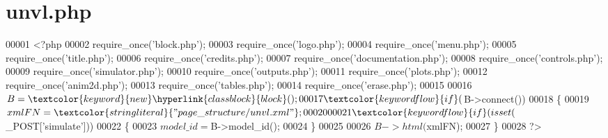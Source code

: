 \hypertarget{unvl_8php_source}{\section{unvl.\-php}
}

\begin{DoxyCode}
00001 <?php
00002 require\_once(\textcolor{stringliteral}{'block.php'});
00003 require\_once(\textcolor{stringliteral}{'logo.php'});
00004 require\_once(\textcolor{stringliteral}{'menu.php'});
00005 require\_once(\textcolor{stringliteral}{'title.php'});
00006 require\_once(\textcolor{stringliteral}{'credits.php'});
00007 require\_once(\textcolor{stringliteral}{'documentation.php'});
00008 require\_once(\textcolor{stringliteral}{'controls.php'});
00009 require\_once(\textcolor{stringliteral}{'simulator.php'});
00010 require\_once(\textcolor{stringliteral}{'outputs.php'});
00011 require\_once(\textcolor{stringliteral}{'plots.php'});
00012 require\_once(\textcolor{stringliteral}{'anim2d.php'});
00013 require\_once(\textcolor{stringliteral}{'tables.php'});
00014 require\_once(\textcolor{stringliteral}{'erase.php'});
00015 
00016 $B=\textcolor{keyword}{new} \hyperlink{classblock}{block}();
00017 \textcolor{keywordflow}{if}($B->connect())
00018 \{
00019   $xmlFN=\textcolor{stringliteral}{"page\_structure/unvl.xml"};
00020 
00021   \textcolor{keywordflow}{if}(isset($\_POST[\textcolor{stringliteral}{'simulate'}]))
00022   \{
00023     $model\_id=$B->model\_id();
00024   \}
00025 
00026   $B->html($xmlFN);
00027 \}
00028 ?>
\end{DoxyCode}
